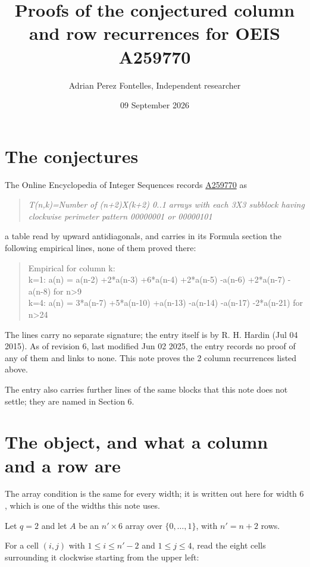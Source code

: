 \documentclass[11pt]{article}
\title{Proofs of the conjectured column and row recurrences for OEIS A259770}
\author{Adrian Perez Fontelles, Independent researcher}
\date{09 September 2026}
\theoremstyle{definition}
\begin{document}
\maketitle
\section{The conjectures}

The Online Encyclopedia of Integer Sequences records \href{https://oeis.org/A259770}{A259770} as

\begin{quote}\itshape T(n,k)=Number of (n+2)X(k+2) 0..1 arrays with each 3X3 subblock having clockwise perimeter pattern 00000001 or 00000101\end{quote}

a table read by upward antidiagonals, and carries in its Formula section the following empirical lines, none of them proved there:

\begin{quote}\ttfamily Empirical for column k:\\
k=1: a(n) = a(n-2) +2*a(n-3) +6*a(n-4) +2*a(n-5) -a(n-6) +2*a(n-7) -a(n-8) for n>9\\k=4: a(n) = 3*a(n-7) +5*a(n-10) +a(n-13) -a(n-14) -a(n-17) -2*a(n-21) for n>24\end{quote}

The lines carry no separate signature; the entry itself is by R. H. Hardin (Jul 04 2015). As of revision 6, last modified Jun 02 2025, the entry records no proof of any of them and links to none. This note proves the 2 column recurrences listed above.

The entry also carries further lines of the same blocks that this note does not settle; they are named in Section 6.

\section{The object, and what a column and a row are}

The array condition is the same for every width; it is written out here for width $6$, which is one of the widths this note uses.

Let $q = 2$ and let $A$ be an $n' \times 6$ array over $\{0,\dots,1\}$, with $n' = n + 2$ rows.

For a cell $(i,j)$ with $1 \le i \le n'-2$ and $1 \le j \le 4$, read the eight cells surrounding it clockwise starting from the upper left:
\end{document}
